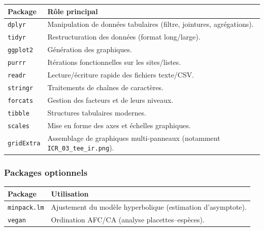 {\def\LTcaptype{none} %
\begin{longtable}[]{@{}
  >{\raggedright\arraybackslash}p{}
  >{\raggedright\arraybackslash}p{}@{}}
\toprule\noalign{}
\begin{minipage}[b]{\linewidth}\raggedright
Package
\end{minipage} & \begin{minipage}[b]{\linewidth}\raggedright
Rôle principal
\end{minipage} \\
\midrule\noalign{}
\endhead
\bottomrule\noalign{}
\endlastfoot
\texttt{dplyr} & Manipulation de données tabulaires (filtre, jointures,
agrégations). \\
\texttt{tidyr} & Restructuration des données (format long/large). \\
\texttt{ggplot2} & Génération des graphiques. \\
\texttt{purrr} & Itérations fonctionnelles sur les sites/listes. \\
\texttt{readr} & Lecture/écriture rapide des fichiers texte/CSV. \\
\texttt{stringr} & Traitements de chaînes de caractères. \\
\texttt{forcats} & Gestion des facteurs et de leurs niveaux. \\
\texttt{tibble} & Structures tabulaires modernes. \\
\texttt{scales} & Mise en forme des axes et échelles graphiques. \\
\texttt{gridExtra} & Assemblage de graphiques multi-panneaux (notamment
\texttt{ICR\_03\_tee\_ir.png}). \\
\end{longtable}
}

\subsubsection{Packages optionnels}\label{packages-optionnels}

{\def\LTcaptype{none} %
\begin{longtable}[]{@{}
  >{\raggedright\arraybackslash}p{}
  >{\raggedright\arraybackslash}p{}@{}}
\toprule\noalign{}
\begin{minipage}[b]{\linewidth}\raggedright
Package
\end{minipage} & \begin{minipage}[b]{\linewidth}\raggedright
Utilisation
\end{minipage} \\
\midrule\noalign{}
\endhead
\bottomrule\noalign{}
\endlastfoot
\texttt{minpack.lm} & Ajustement du modèle hyperbolique (estimation
d'asymptote). \\
\texttt{vegan} & Ordination AFC/CA (analyse placettes--espèces). \\
\end{longtable}
}

